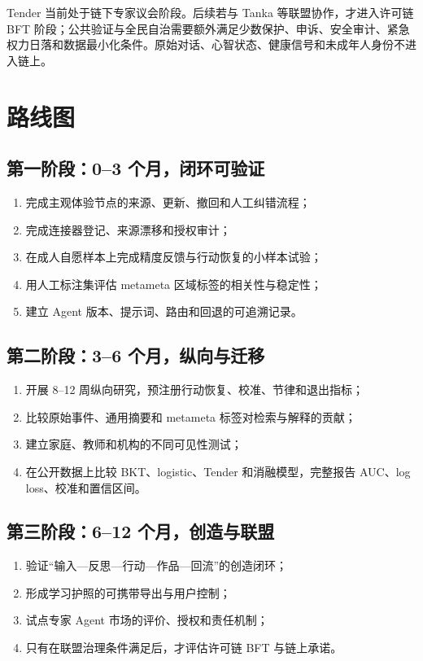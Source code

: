 \documentclass[UTF8,a4paper,11pt]{ctexart}
\begin{document}
Tender 当前处于链下专家议会阶段。后续若与 Tanka 等联盟协作，才进入许可链 BFT 阶段；公共验证与全民自治需要额外满足少数保护、申诉、安全审计、紧急权力日落和数据最小化条件。原始对话、心智状态、健康信号和未成年人身份不进入链上。

\newpage
\section{路线图}

\subsection{第一阶段：0--3 个月，闭环可验证}

\begin{enumerate}
\item 完成主观体验节点的来源、更新、撤回和人工纠错流程；
\item 完成连接器登记、来源漂移和授权审计；
\item 在成人自愿样本上完成精度反馈与行动恢复的小样本试验；
\item 用人工标注集评估 metameta 区域标签的相关性与稳定性；
\item 建立 Agent 版本、提示词、路由和回退的可追溯记录。
\end{enumerate}

\subsection{第二阶段：3--6 个月，纵向与迁移}

\begin{enumerate}
\item 开展 8--12 周纵向研究，预注册行动恢复、校准、节律和退出指标；
\item 比较原始事件、通用摘要和 metameta 标签对检索与解释的贡献；
\item 建立家庭、教师和机构的不同可见性测试；
\item 在公开数据上比较 BKT、logistic、Tender 和消融模型，完整报告 AUC、log loss、校准和置信区间。
\end{enumerate}

\subsection{第三阶段：6--12 个月，创造与联盟}

\begin{enumerate}
\item 验证“输入—反思—行动—作品—回流”的创造闭环；
\item 形成学习护照的可携带导出与用户控制；
\item 试点专家 Agent 市场的评价、授权和责任机制；
\item 只有在联盟治理条件满足后，才评估许可链 BFT 与链上承诺。
\end{enumerate}
\end{document}
